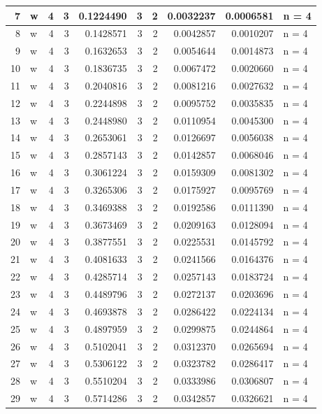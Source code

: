 \documentclass[
  letterpaper,
  DIV=11,
  numbers=noendperiod]{scrreprt}
\begin{document}
\begin{table}
\begin{tabular}[t]{r|l|r|r|r|r|r|r|r|l}
\hline
7 & w & 4 & 3 & 0.1224490 & 3 & 2 & 0.0032237 & 0.0006581 & n = 4\\
\hline
8 & w & 4 & 3 & 0.1428571 & 3 & 2 & 0.0042857 & 0.0010207 & n = 4\\
\hline
9 & w & 4 & 3 & 0.1632653 & 3 & 2 & 0.0054644 & 0.0014873 & n = 4\\
\hline
10 & w & 4 & 3 & 0.1836735 & 3 & 2 & 0.0067472 & 0.0020660 & n = 4\\
\hline
11 & w & 4 & 3 & 0.2040816 & 3 & 2 & 0.0081216 & 0.0027632 & n = 4\\
\hline
12 & w & 4 & 3 & 0.2244898 & 3 & 2 & 0.0095752 & 0.0035835 & n = 4\\
\hline
13 & w & 4 & 3 & 0.2448980 & 3 & 2 & 0.0110954 & 0.0045300 & n = 4\\
\hline
14 & w & 4 & 3 & 0.2653061 & 3 & 2 & 0.0126697 & 0.0056038 & n = 4\\
\hline
15 & w & 4 & 3 & 0.2857143 & 3 & 2 & 0.0142857 & 0.0068046 & n = 4\\
\hline
16 & w & 4 & 3 & 0.3061224 & 3 & 2 & 0.0159309 & 0.0081302 & n = 4\\
\hline
17 & w & 4 & 3 & 0.3265306 & 3 & 2 & 0.0175927 & 0.0095769 & n = 4\\
\hline
18 & w & 4 & 3 & 0.3469388 & 3 & 2 & 0.0192586 & 0.0111390 & n = 4\\
\hline
19 & w & 4 & 3 & 0.3673469 & 3 & 2 & 0.0209163 & 0.0128094 & n = 4\\
\hline
20 & w & 4 & 3 & 0.3877551 & 3 & 2 & 0.0225531 & 0.0145792 & n = 4\\
\hline
21 & w & 4 & 3 & 0.4081633 & 3 & 2 & 0.0241566 & 0.0164376 & n = 4\\
\hline
22 & w & 4 & 3 & 0.4285714 & 3 & 2 & 0.0257143 & 0.0183724 & n = 4\\
\hline
23 & w & 4 & 3 & 0.4489796 & 3 & 2 & 0.0272137 & 0.0203696 & n = 4\\
\hline
24 & w & 4 & 3 & 0.4693878 & 3 & 2 & 0.0286422 & 0.0224134 & n = 4\\
\hline
25 & w & 4 & 3 & 0.4897959 & 3 & 2 & 0.0299875 & 0.0244864 & n = 4\\
\hline
26 & w & 4 & 3 & 0.5102041 & 3 & 2 & 0.0312370 & 0.0265694 & n = 4\\
\hline
27 & w & 4 & 3 & 0.5306122 & 3 & 2 & 0.0323782 & 0.0286417 & n = 4\\
\hline
28 & w & 4 & 3 & 0.5510204 & 3 & 2 & 0.0333986 & 0.0306807 & n = 4\\
\hline
29 & w & 4 & 3 & 0.5714286 & 3 & 2 & 0.0342857 & 0.0326621 & n = 4\\

\end{tabular}
\end{table}
\end{document}
